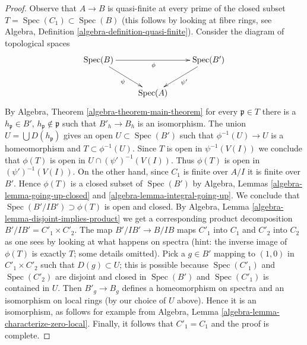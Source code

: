 \documentclass[10pt,a4paper]{amsart}
\theoremstyle{plain}
\theoremstyle{definition}
\theoremstyle{remark}
\numberwithin{equation}{subsection}
\def\Spec{\mathop{\mathrm{Spec}}}
\begin{document}
\begin{proof}
Observe that $A \to B$ is quasi-finite at every prime of the
closed subset $T = \Spec(C_1) \subset \Spec(B)$ (this follows
by looking at fibre rings, see
Algebra, Definition \ref{algebra-definition-quasi-finite}).
Consider the diagram of topological spaces
$$
\xymatrix{
\Spec(B) \ar[rr]_\phi \ar[rd]_\psi & & \Spec(B') \ar[ld]^{\psi'} \\
& \Spec(A)
}
$$
By Algebra, Theorem \ref{algebra-theorem-main-theorem}
for every $\mathfrak p \in T$ there is a $h_\mathfrak p \in B'$,
$h_\mathfrak p \not \in \mathfrak p$ such that $B'_h \to B_h$ is
an isomorphism. The union $U = \bigcup D(h_\mathfrak p)$ gives an open
$U \subset \Spec(B')$ such that $\phi^{-1}(U) \to U$ is a homeomorphism
and $T \subset \phi^{-1}(U)$. Since $T$ is open in $\psi^{-1}(V(I))$
we conclude that $\phi(T)$ is open in $U \cap (\psi')^{-1}(V(I))$.
Thus $\phi(T)$ is open in $(\psi')^{-1}(V(I))$.
On the other hand, since $C_1$ is finite over $A/I$ it is
finite over $B'$. Hence $\phi(T)$ is a closed subset of $\Spec(B')$
by Algebra, Lemmas \ref{algebra-lemma-going-up-closed} and
\ref{algebra-lemma-integral-going-up}. We conclude that
$\Spec(B'/IB') \supset \phi(T)$ is open and closed. By
Algebra, Lemma \ref{algebra-lemma-disjoint-implies-product}
we get a corresponding product decomposition $B'/IB' = C'_1 \times C'_2$.
The map $B'/IB' \to B/IB$ maps $C'_1$ into $C_1$ and $C'_2$ into $C_2$
as one sees by looking at what happens on spectra (hint: the inverse
image of $\phi(T)$ is exactly $T$; some details omitted).
Pick a $g \in B'$ mapping to $(1, 0)$ in $C'_1 \times C'_2$
such that $D(g) \subset U$; this is possible because $\Spec(C'_1)$
and $\Spec(C'_2)$ are disjoint and closed in $\Spec(B')$ and
$\Spec(C'_1)$ is contained in $U$. Then $B'_g \to B_g$ defines a homeomorphism
on spectra and an isomorphism on local rings (by our choice of $U$ above).
Hence it is an isomorphism, as follows for example from
Algebra, Lemma \ref{algebra-lemma-characterize-zero-local}.
Finally, it follows that $C'_1 = C_1$ and the proof is complete.
\end{proof}
\end{document}
